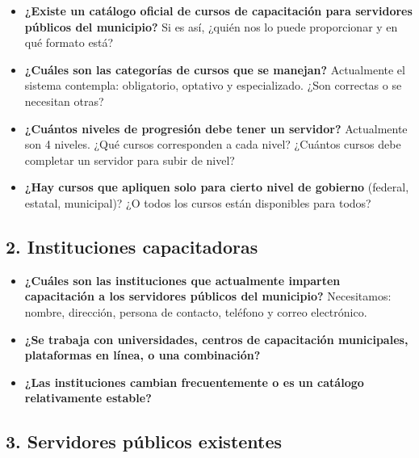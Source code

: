 \documentclass[12pt,letterpaper]{article}
\begin{document}
\begin{itemize}
\item \textbf{¿Existe un catálogo oficial de cursos de capacitación para servidores públicos del municipio?} Si es así, ¿quién nos lo puede proporcionar y en qué formato está?

\item \textbf{¿Cuáles son las categorías de cursos que se manejan?} Actualmente el sistema contempla: obligatorio, optativo y especializado. ¿Son correctas o se necesitan otras?

\item \textbf{¿Cuántos niveles de progresión debe tener un servidor?} Actualmente son 4 niveles. ¿Qué cursos corresponden a cada nivel? ¿Cuántos cursos debe completar un servidor para subir de nivel?

\item \textbf{¿Hay cursos que apliquen solo para cierto nivel de gobierno} (federal, estatal, municipal)? ¿O todos los cursos están disponibles para todos?
\end{itemize}

\subsection{2. Instituciones capacitadoras}

\begin{itemize}
\item \textbf{¿Cuáles son las instituciones que actualmente imparten capacitación a los servidores públicos del municipio?} Necesitamos: nombre, dirección, persona de contacto, teléfono y correo electrónico.

\item \textbf{¿Se trabaja con universidades, centros de capacitación municipales, plataformas en línea, o una combinación?}

\item \textbf{¿Las instituciones cambian frecuentemente o es un catálogo relativamente estable?}
\end{itemize}

\subsection{3. Servidores públicos existentes}
\end{document}
